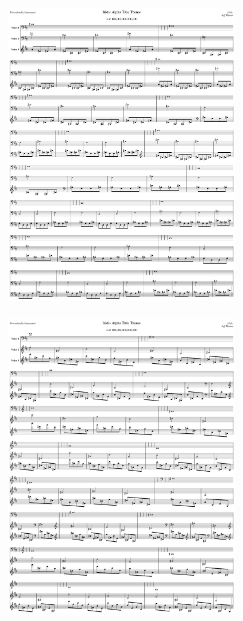 \begin{figure}[H]
{
  \setlength{\tabcolsep}{3.0pt}
  \setlength\cmidrulewidth{\heavyrulewidth} %
    \begin{subfigure}{0.5\textwidth}
  \includegraphics[width=6cm]{music/title_no_3_page_1001.png}%
    \end{subfigure}
  \begin{subfigure}{0.5\textwidth}
  \includegraphics[width=6cm]{music/title_no_4_page_1001.png}%
    \end{subfigure}
}
\end{figure}

